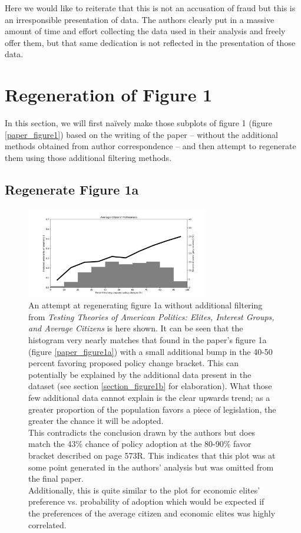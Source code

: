 \documentclass[]{article}
\begin{document}
Here we would like to reiterate that this is not an accusation of fraud but this is an irresponsible presentation of data.
The authors clearly put in a massive amount of time and effort collecting the data used in their analysis and freely offer them, but that same dedication is not reflected in the presentation of those data.

\newpage
\section{Regeneration of Figure 1}
In this section, we will first naïvely make those subplots of figure 1 (figure \ref{paper_figure1}) based on the writing of the paper -- without the additional methods obtained from author correspondence -- and then attempt to regenerate them using those additional filtering methods.

\subsection{Regenerate Figure 1a}
\begin{figure}[H]
	\begin{center}
		\includegraphics[width=300px]{./figures/generated/average-citizens-preferences.png}
	\end{center}	
	\caption{An attempt at regenerating figure 1a without additional filtering from \textit{Testing Theories of American Politics: Elites, Interest Groups, and Average Citizens} is here shown. It can be seen that the histogram very nearly matches that found in the paper's figure 1a (figure \ref{paper_figure1a}) with a small additional bump in the 40-50 percent favoring proposed policy change bracket. This can potentially be explained by the additional data present in the dataset (see section \ref{section_figure1b} for elaboration). What those few additional data cannot explain is the clear upwards trend; as a greater proportion of the population favors a piece of legislation, the greater the chance it will be adopted. \\This contradicts the conclusion drawn by the authors but does match the 43\% chance of policy adoption at the 80-90\% favor bracket described on page 573R. This indicates that this plot was at some point generated in the authors' analysis but was omitted from the final paper.\\Additionally, this is quite similar to the plot for economic elites' preference vs. probability of adoption which would be expected if the preferences of the average citizen and economic elites was highly correlated.}
	\label{generated_figure1a}
\end{figure}
\end{document}
